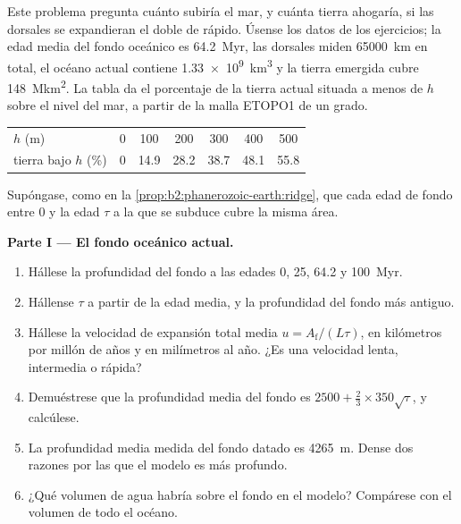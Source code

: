 \begin{problem}\label{pb:b2:phanerozoic-earth:1}
Este problema pregunta cuánto subiría el mar, y cuánta tierra ahogaría, si las
dorsales se expandieran el doble de rápido. Úsense los datos de los ejercicios; la edad media del fondo oceánico es
\qty{64.2}{Myr}, las dorsales miden \qty{65000}{km} en total, el océano actual contiene
\qty{1.33e9}{km^3} y la tierra emergida cubre \qty{148}{\mega km^2}. La tabla da el porcentaje de la
tierra actual situada a menos de $h$ sobre el nivel del mar, a partir de la malla ETOPO1 de un grado.
\begin{center}
\small
\begin{tabular}{lcccccc}
\hline
$h$ (\unit{m}) & 0 & 100 & 200 & 300 & 400 & 500 \\
tierra bajo $h$ (\unit{\percent}) & 0 & 14.9 & 28.2 & 38.7 & 48.1 & 55.8 \\
\hline
\end{tabular}
\end{center}
Supóngase, como en la \cref{prop:b2:phanerozoic-earth:ridge}, que cada edad de fondo entre 0 y la
edad $\tau$ a la que se subduce cubre la misma área.

\noindent\textbf{Parte I --- El fondo oceánico actual.}
\begin{enumerate}
  \item Hállese la profundidad del fondo a las edades 0, 25, 64.2 y \qty{100}{Myr}.
  \item Hállense $\tau$ a partir de la edad media, y la profundidad del fondo más antiguo.
  \item Hállese la velocidad de expansión total media $u = A_{\text{f}}/(L\tau)$, en kilómetros por millón
        de años y en milímetros al año. ¿Es una velocidad lenta, intermedia o rápida?
  \item Demuéstrese que la profundidad media del fondo es $2500 + \tfrac23 \times 350\sqrt\tau$, y
        calcúlese.
  \item La profundidad media medida del fondo datado es \qty{4265}{m}. Dense dos razones por las que el
        modelo es más profundo.
  \item ¿Qué volumen de agua habría sobre el fondo en el modelo? Compárese con el volumen de
        todo el océano.
\end{enumerate}


\end{problem}

